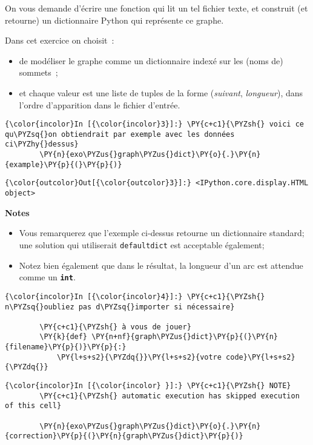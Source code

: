     On vous demande d'écrire une fonction qui lit un tel fichier texte, et
construit (et retourne) un dictionnaire Python qui représente ce graphe.

Dans cet exercice on choisit~:

\begin{itemize}
\tightlist
\item
  de modéliser le graphe comme un dictionnaire indexé sur les (noms de)
  sommets~;
\item
  et chaque valeur est une liste de tuples de la forme (\emph{suivant},
  \emph{longueur}), dans l'ordre d'apparition dans le fichier d'entrée.
\end{itemize}

    \begin{Verbatim}[commandchars=\\\{\}]
{\color{incolor}In [{\color{incolor}3}]:} \PY{c+c1}{\PYZsh{} voici ce qu\PYZsq{}on obtiendrait par exemple avec les données ci\PYZhy{}dessus}
        \PY{n}{exo\PYZus{}graph\PYZus{}dict}\PY{o}{.}\PY{n}{example}\PY{p}{(}\PY{p}{)}
\end{Verbatim}


\begin{Verbatim}[commandchars=\\\{\}]
{\color{outcolor}Out[{\color{outcolor}3}]:} <IPython.core.display.HTML object>
\end{Verbatim}
            
    \textbf{Notes}

\begin{itemize}
\tightlist
\item
  Vous remarquerez que l'exemple ci-dessus retourne un dictionnaire
  standard; une solution qui utiliserait \texttt{defaultdict} est
  acceptable également;
\item
  Notez bien également que dans le résultat, la longueur d'un arc est
  attendue comme un \textbf{\texttt{int}}.
\end{itemize}

    \begin{Verbatim}[commandchars=\\\{\}]
{\color{incolor}In [{\color{incolor}4}]:} \PY{c+c1}{\PYZsh{} n\PYZsq{}oubliez pas d\PYZsq{}importer si nécessaire}
        
        \PY{c+c1}{\PYZsh{} à vous de jouer}
        \PY{k}{def} \PY{n+nf}{graph\PYZus{}dict}\PY{p}{(}\PY{n}{filename}\PY{p}{)}\PY{p}{:}
            \PY{l+s+s2}{\PYZdq{}}\PY{l+s+s2}{votre code}\PY{l+s+s2}{\PYZdq{}}
\end{Verbatim}


    \begin{Verbatim}[commandchars=\\\{\}]
{\color{incolor}In [{\color{incolor} }]:} \PY{c+c1}{\PYZsh{} NOTE}
        \PY{c+c1}{\PYZsh{} automatic execution has skipped execution of this cell}
        
        \PY{n}{exo\PYZus{}graph\PYZus{}dict}\PY{o}{.}\PY{n}{correction}\PY{p}{(}\PY{n}{graph\PYZus{}dict}\PY{p}{)}
\end{Verbatim}



    
    
    
